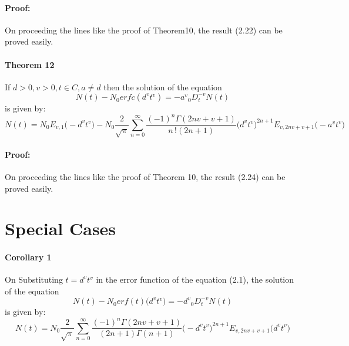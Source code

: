 \documentclass{article}
\begin{document}
\paragraph{Proof:}
On proceeding the lines like the proof of Theorem10, the result (2.22) can be proved easily.
\paragraph{Theorem 12}
If $d > 0, v > 0, t \in C, a \neq d $ then the solution of the equation
\begin{equation}
    N(t) - {N_0}erfc({d^v}{t^v}) = {-a^v}{_0D_t^{-v}}N(t)
\end{equation}
is given by:
\begin{equation}
    N(t)=
    N_0
    E_{v, 1}
    {\big(-{{d^v}}{t^v}\big)}
    -N_0{\frac{2}{\sqrt{\pi}}}
    \sum_{n = 0}^{\infty}
    \frac{(-1)^n\Gamma{(2nv+v+1)}}{n\,!(2n+1)}
    \big({d^v}{t^v}\big)^{2n+1}
    E_{v, 2nv+v+1}
    \big(-{a^v}{t^v})
\end{equation}
\paragraph{Proof:}
On proceeding the lines like the proof of Theorem 10, the result (2.24) can be proved easily.
\section{Special Cases}
\paragraph{Corollary 1}
On Substituting $t = {d^v}{t^v}$ in the error function of the equation (2.1), the solution of the equation
\begin{equation}
    N(t) -{N_0}erf(t)\big({d^v}{t^v}\big)= {-d^v}{_0D_t^{-v}}N(t)
\end{equation}
is given by:
\begin{equation}
    N(t) = N_0
    {\frac{2}{\sqrt{\pi}}}
    \sum_{n = 0}^{\infty}
    \frac{{(-1)^n}\Gamma{(2nv+v+1)}}{(2n+1)\Gamma{(n+1)}}
    \big(-{d^v}{t^v}\big)^{2n+1}
    E_{v, 2nv+v+1}
    \big({d^v}{t^v}\big)
\end{equation}
\end{document}
